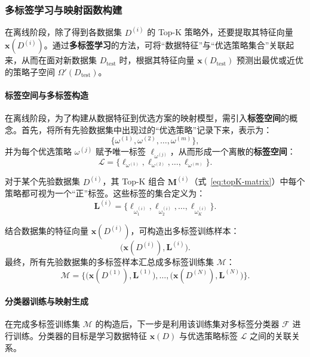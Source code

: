 \documentclass[10pt]{article} %
\numberwithin{equation}{section}
\begin{document}
\subsubsection{多标签学习与映射函数构建}
\label{subsec:multi-label}

在离线阶段，除了得到各数据集 $D^{(i)}$ 的 Top-K 策略外，还要提取其特征向量 $\mathbf{x}(D^{(i)})$。通过\textbf{多标签学习}的方法，可将“数据特征”与“优选策略集合”关联起来，从而在面对新数据集 $D_{\text{test}}$ 时，根据其特征向量 $\mathbf{x}(D_{\text{test}})$ 预测出最优或近优的策略子空间 $\Omega'(D_{\text{test}})$。

\paragraph{标签空间与多标签构造}  
在离线阶段，为了构建从数据特征到优选方案的映射模型，需引入\textbf{标签空间}的概念。首先，将所有先验数据集中出现过的“优选策略”记录下来，表示为：
\[
\{\omega^{(1)}, \omega^{(2)}, \ldots, \omega^{(m)}\},
\]
并为每个优选策略 $\omega^{(j)}$ 赋予唯一标签 $\ell_{\omega^{(j)}}$，从而形成一个离散的\textbf{标签空间}：
\begin{equation}\label{eq:label-space}
\mathcal{L}
= \{\ell_{\omega^{(1)}}, \ell_{\omega^{(2)}}, \ldots, \ell_{\omega^{(m)}}\}.
\end{equation}

对于某个先验数据集 $D^{(i)}$，其 Top-K 组合 $\mathbf{M}^{(i)}$（式~\eqref{eq:topK-matrix}）中每个策略都可视为一个“正”标签。这些标签的集合定义为：
\begin{equation}\label{eq:label-space-for-D}
\mathbf{L}^{(i)}
= \{\ell_{\omega_1^{(i)}}, \ell_{\omega_2^{(i)}}, \ldots, \ell_{\omega_K^{(i)}}\}.
\end{equation}

结合数据集的特征向量 $\mathbf{x}(D^{(i)})$，可构造出多标签训练样本：
\[
\bigl(\mathbf{x}(D^{(i)}), \mathbf{L}^{(i)}\bigr).
\]
最终，所有先验数据集的多标签样本汇总成多标签训练集 $\mathcal{M}$：
\begin{equation}\label{eq:training-set}
\mathcal{M}
= \bigl\{\bigl(\mathbf{x}(D^{(1)}), \mathbf{L}^{(1)}\bigr), \ldots, \bigl(\mathbf{x}(D^{(N)}), \mathbf{L}^{(N)}\bigr)\bigr\}.
\end{equation}

\paragraph{分类器训练与映射生成}  
在完成多标签训练集 $\mathcal{M}$ 的构造后，下一步是利用该训练集对多标签分类器 $\mathcal{F}$ 进行训练。分类器的目标是学习数据特征 $\mathbf{x}(D)$ 与优选策略标签 $\mathcal{L}$ 之间的关联关系。
\end{document}

